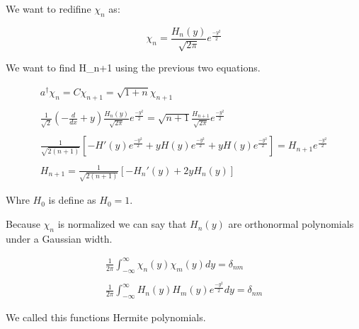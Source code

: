 We want to redifine $\chi_n$ as:

\begin{equation}
  \chi_n = \frac{H_n(y)}{\sqrt{2\pi}}e^{\frac{-y^2}{2}}
\end{equation}

We want to find H_{n+1} using the previous two equations.

\begin{equation}
  \begin{array}{c}
    a^\dagger \chi_n = C \chi_{n+1} = \sqrt{1+n} \chi_{n+1}
    \\

    \\
    \frac{1}{\sqrt{2}}\left(-\frac{d}{dx}+y\right)\frac{H_n(y)}{\sqrt{2\pi}}e^{\frac{-y^2}{2}} = \sqrt{n+1} \frac{H_{n+1}}{\sqrt{2\pi}}e^{\frac{-y^2}{2}}
    \\

    \\
    \frac{1}{\sqrt{2(n+1)}}\left[-H'(y)e^{\frac{-y^2}{2}}+y H(y)e^\frac{-y^2}{2}+y H(y)e^\frac{-y^2}{2}\right]= H_{n+1} e^\frac{-y^2}{2}
    \\

    \\
    H_{n+1} = \frac{1}{\sqrt{2(n+1)}}\left[-H_n'(y)+2 y H_n(y)\right]
  \end{array}
\end{equation}

Whre $H_0$ is define as $H_0=1$.

Because $\chi_n$ is normalized we can say that $H_n(y)$ are orthonormal polynomials under a Gaussian width.

\begin{equation}
  \begin{array}{c}
    \frac{1}{2\pi}\int_{-\infty}^{\infty} \chi_n(y) \chi_m(y) dy = \delta_{nm}
    \\

    \\
    \frac{1}{2\pi}\int_{-\infty}^{\infty} H_n(y) H_m(y) e^{\frac{-y^2}{2}}dy = \delta_{nm}
  \end{array}
\end{equation}

We called this functions Hermite polynomials.

